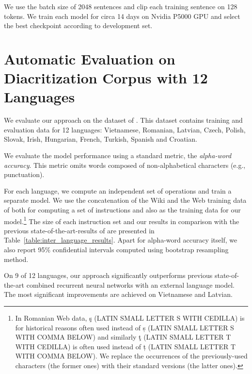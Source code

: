 \documentclass{pbmlarxiv}
\begin{document}
We use the batch size of 2048 sentences and clip each training sentence on 128 tokens. We train each model for circa 14 days on Nvidia P5000 GPU and select the best checkpoint according to development set.


\section{Automatic Evaluation on Diacritization Corpus with 12 Languages}

We evaluate our approach on the dataset of \citet{naplava2018diacritics}. This dataset contains training and evaluation data for 12 languages: Vietnamese, Romanian, Latvian, Czech, Polish, Slovak, Irish, Hungarian, French, Turkish, Spanish and Croatian.

We evaluate the model performance using a standard metric, the \textit{alpha-word accuracy}. This metric omits words composed of non-alphabetical characters (e.g., punctuation).

For each language, we compute an independent set of operations and train a separate model. We use the concatenation of the Wiki and the Web training data of \cite{naplava2018diacritics} both for computing a set of instructions and also as the training data for our model.\footnote{In Romanian Web data, ş (LATIN SMALL LETTER S WITH CEDILLA) is for historical reasons often used instead of ș (LATIN SMALL LETTER S WITH COMMA BELOW) and similarly ţ (LATIN SMALL LETTER T WITH CEDILLA) is often used instead of ț (LATIN SMALL LETTER T WITH COMMA BELOW). We replace the occurrences of the previously-used characters (the former ones) with their standard versions (the latter ones).} The size of each instruction set and our results in comparison with the previous state-of-the-art-results of \citet{naplava2018diacritics} are presented in Table~\ref{table:inter_language_results}.
Apart for alpha-word accuracy itself, we also report 95\% confidential intervals computed using bootstrap resampling method.

On 9 of 12 languages, our approach significantly outperforms previous state-of-the-art combined recurrent neural networks with an external language model. The most significant improvements are achieved on Vietnamese and Latvian.
\end{document}
